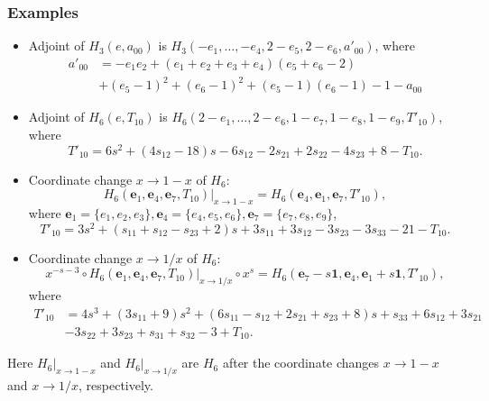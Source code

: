 \documentclass[a4paper,12pt]{article}
\theoremstyle{definition}
\theoremstyle{remark}
\numberwithin{equation}{section} %
\begin{document}
   \subsubsection{Examples }\label{cochH6}%
   \begin{itemize}
     \item Adjoint of $H_3(e,a_{00})$ is $H_3(-e_1,\dots,-e_4,2-e_5,2-e_6,a'_{00})$, where %
$$\begin{array}{ll}a'_{00}&=-e_1 e_2 +(e_1+e_2+e_3+e_4)(e_5+e_6-2)\\&+(e_5-1)^2+(e_6-1)^2+(e_5-1)(e_6-1)-1-a_{00}
\end{array}$$
\item Adjoint of $H_6(e,T_{10})$ is $H_6(2-e_1,\dots,2-e_6,1-e_7,1-e_8,1-e_9, T'_{10})$, where %
$$
T'_{10}=6s^2 + (4s_{12} - 18)s - 6s_{12} - 2s_{21} + 2s_{22} - 4s_{23} + 8 - T_{10}.
$$
\item Coordinate change $x\to1-x$ of $H_6$:
     $$H_6({\bm e}_1,{\bm e}_4,{\bm e}_7,T_{10})|_{x\to1-x}=H_6({\bm e}_4,{\bm e}_1,{\bm e}_7,T'_{10}),$$
   where ${\bm e}_1=\{e_1,e_2,e_3\},{\bm e}_4=\{e_4,e_5,e_6\},{\bm e}_7=\{e_7,e_8,e_9\}$,
   $$T'_{10}=3s^2 + (s_{11} + s_{12} - s_{23} + 2)s + 3s_{11} + 3s_{12} - 3s_{23} - 3s_{33} - 21-T_{10}.$$
 \item Coordinate change $x\to1/x$ of $H_6$:   $$x^{-s-3}\circ H_6({\bm e}_1,{\bm e}_4,{\bm e}_7,T_{10})|_{x\to1/x}\circ x^s=H_6({\bm e}_7-s{\bm1},{\bm e}_4,{\bm e}_1+s{\bm1},T'_{10}),$$
   where
   $$\begin{array}{ll}T'_{10}&=4s^3 + (3s_{11} + 9)s^2 + (6s_{11} - s_{12} + 2s_{21} + s_{23} + 8)s + s_{33} + 6s_{12} + 3s_{21} \\
     &- 3s_{22}+ 3s_{23} + s_{31} + s_{32} - 3+T_{10}.\end{array}$$
   \end{itemize}
Here $H_6|_{x\to1-x}$ and $H_6|_{x\to1/x}$ are $H_6$ after the coordinate changes $x\to1-x$ and $x\to1/x$, respectively.
\end{document}
